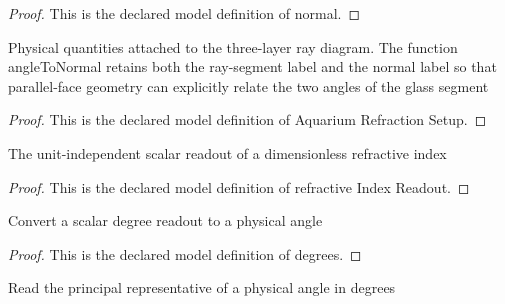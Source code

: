 \begin{proof}
  This is the declared model definition of normal.
\end{proof}
\begin{definition}
  \label{def:physics:phyx-mini-0143:phyxminiproblems-problemphyxmini0143-aquariumrefractionsetup}
  Physical quantities attached to the three-layer ray diagram. The function angleToNormal retains both the ray-segment label and the normal label so that parallel-face geometry can explicitly relate the two angles of the glass segment
\end{definition}
\begin{proof}
  This is the declared model definition of Aquarium Refraction Setup.
\end{proof}
\begin{definition}
  \label{def:physics:phyx-mini-0143:phyxminiproblems-problemphyxmini0143-refractiveindexreadout}
  The unit-independent scalar readout of a dimensionless refractive index
\end{definition}
\begin{proof}
  This is the declared model definition of refractive Index Readout.
\end{proof}
\begin{definition}[degrees]
  \label{def:physics:phyx-mini-0143:phyxminiproblems-problemphyxmini0143-degrees}
  Convert a scalar degree readout to a physical angle
\end{definition}
\begin{proof}
  This is the declared model definition of degrees.
\end{proof}
\begin{definition}
  \label{def:physics:phyx-mini-0143:phyxminiproblems-problemphyxmini0143-degreereadout}
  Read the principal representative of a physical angle in degrees
\end{definition}
